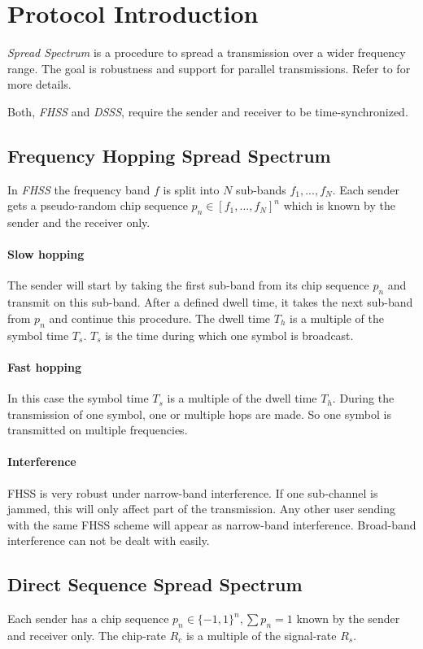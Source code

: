 \section{Protocol Introduction}
\label{sec:theory}
	\emph{Spread  Spectrum} is a procedure to spread a transmission over a wider frequency range. The goal is robustness and support for parallel transmissions.
	Refer to \cite{ISS} for more details.
	
	Both, \emph{FHSS} and \emph{DSSS}, require the sender and receiver to be time-synchronized. 
	
	\subsection{Frequency Hopping Spread Spectrum}
		In \emph{FHSS} the frequency band $f$ is split into $N$ sub-bands $f_1,..., f_N$. Each sender gets a pseudo-random chip sequence $p_n \in [f_1,...,f_N]^n$ which is known by the sender and the receiver only.
		
		\paragraph{Slow hopping} The sender will start by taking the first sub-band from its chip sequence $p_n$ and transmit on this sub-band.
		After a defined dwell time, it takes the next sub-band from $p_n$ and continue this procedure. The dwell time $T_h$ is a multiple of the symbol time $T_s$. $T_s$ is the time during which one symbol is broadcast.
		
		\paragraph{Fast hopping} In this case the symbol time $T_s$ is a multiple of the dwell time $T_h$. During the transmission of one symbol, one or multiple hops are made. So one symbol is transmitted on multiple frequencies.
		
		\paragraph{Interference} FHSS is very robust under narrow-band interference. If one sub-channel is jammed, this will only affect part of the transmission. Any other user sending with the same FHSS scheme will appear as narrow-band interference.
		Broad-band interference can not be dealt with easily.
		
	
	\subsection{Direct Sequence Spread Spectrum}
		Each sender has a chip sequence $p_n \in \{-1,1\}^n, \sum p_n = 1$ known by the sender and receiver only. The chip-rate $R_c$ is a multiple of the signal-rate $R_s$.
		
